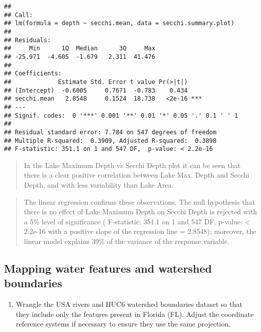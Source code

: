 \documentclass[]{article}
\newenvironment{Shaded}{\begin{snugshade}}{\end{snugshade}}
\newcommand{\CommentTok}[1]{\textcolor[rgb]{0.56,0.35,0.01}{\textit{#1}}}
\newcommand{\KeywordTok}[1]{\textcolor[rgb]{0.13,0.29,0.53}{\textbf{#1}}}
\newcommand{\NormalTok}[1]{#1}
\newcommand{\OperatorTok}[1]{\textcolor[rgb]{0.81,0.36,0.00}{\textbf{#1}}}
\newcommand{\StringTok}[1]{\textcolor[rgb]{0.31,0.60,0.02}{#1}}
\providecommand{\tightlist}{%
  \setlength{\itemsep}{0pt}\setlength{\parskip}{0pt}}
\begin{document}
\begin{verbatim}
## 
## Call:
## lm(formula = depth ~ secchi.mean, data = secchi.summary.plot)
## 
## Residuals:
##     Min      1Q  Median      3Q     Max 
## -25.971  -4.605  -1.679   2.311  41.476 
## 
## Coefficients:
##             Estimate Std. Error t value Pr(>|t|)    
## (Intercept)  -0.6005     0.7671  -0.783    0.434    
## secchi.mean   2.8548     0.1524  18.738   <2e-16 ***
## ---
## Signif. codes:  0 '***' 0.001 '**' 0.01 '*' 0.05 '.' 0.1 ' ' 1
## 
## Residual standard error: 7.784 on 547 degrees of freedom
## Multiple R-squared:  0.3909, Adjusted R-squared:  0.3898 
## F-statistic: 351.1 on 1 and 547 DF,  p-value: < 2.2e-16
\end{verbatim}

\begin{quote}
In the Lake Maximum Depth vs Secchi Depth plot it can be seen that there
is a clear positive correlation between Lake Max. Depth and Secchi
Depth, and with less variability than Lake Area.
\end{quote}

\begin{quote}
The linear regression confirms these observations. The null hypothesis
that there is no effect of Lake Maximum Depth on Secchi Depth is
rejected with a 5\% level of significance ( F-statistic: 351.1 on 1 and
547 DF, p-value: \textless{} 2.2e-16 with a positive slope of the
regression line = 2.8548); moreover, the linear model explains 39\% of
the variance of the response variable.
\end{quote}

\hypertarget{mapping-water-features-and-watershed-boundaries}{%
\subsection{Mapping water features and watershed
boundaries}\label{mapping-water-features-and-watershed-boundaries}}

\begin{enumerate}
\def\labelenumi{\arabic{enumi}.}
\setcounter{enumi}{9}
\tightlist
\item
  Wrangle the USA rivers and HUC6 watershed boundaries dataset so that
  they include only the features present in Florida (FL). Adjust the
  coordinate reference systems if necessary to ensure they use the same
  projection.
\end{enumerate}

\begin{Shaded}
\end{Shaded}
\end{document}
